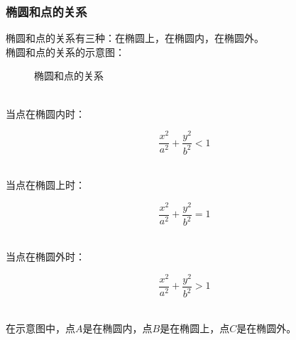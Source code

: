 \documentclass[UTF8]{ctexart}
\begin{document}
\subsubsection{椭圆和点的关系}
    椭圆和点的关系有三种：在椭圆上，在椭圆内，在椭圆外。\\[3mm]
    椭圆和点的关系的示意图：
    \begin{figure}[h!]
        \begin{center}
            \caption{椭圆和点的关系}
        \end{center}
    \end{figure}\\
    当点在椭圆内时：
    \begin{large}
        \begin{equation*}
            \frac{x^2}{a^2}+\frac{y^2}{b^2}<1
        \end{equation*}
    \end{large}\\
    当点在椭圆上时：
    \begin{large}
        \begin{equation*}
            \frac{x^2}{a^2}+\frac{y^2}{b^2}=1
        \end{equation*}
    \end{large}\\
    当点在椭圆外时：
    \begin{large}
        \begin{equation*}
            \frac{x^2}{a^2}+\frac{y^2}{b^2}>1
        \end{equation*}
    \end{large}\\
    在示意图中，点$A$是在椭圆内，点$B$是在椭圆上，点$C$是在椭圆外。

\newpage
\end{document}

